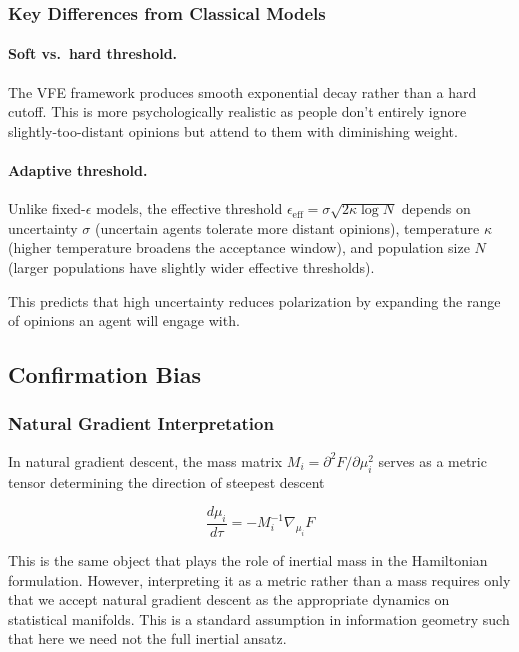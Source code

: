 \documentclass[12pt]{article}
\begin{document}
\subsubsection{Key Differences from Classical Models}

\paragraph{Soft vs.\ hard threshold.} The VFE framework produces smooth exponential 
decay rather than a hard cutoff. This is more psychologically realistic as people 
don't entirely ignore slightly-too-distant opinions but attend to them with 
diminishing weight.

\paragraph{Adaptive threshold.} Unlike fixed-$\epsilon$ models, the effective 
threshold $\epsilon_{\text{eff}} = \sigma\sqrt{2\kappa\log N}$ depends on uncertainty $\sigma$ (uncertain agents tolerate more distant opinions), 
temperature $\kappa$ (higher temperature broadens the acceptance window), and
population size $N$ (larger populations have slightly wider effective thresholds).


This predicts that high uncertainty reduces polarization by expanding the range of opinions an agent will engage with.

\subsection{Confirmation Bias}

\subsubsection{Natural Gradient Interpretation}

In natural gradient descent, the mass matrix $M_i = \partial^2 F/\partial\mu_i^2$ 
serves as a metric tensor determining the direction of steepest descent

\begin{equation}
\frac{d\mu_i}{d\tau} = -M_i^{-1} \nabla_{\mu_i} F
\end{equation}

This is the same object that plays the role of inertial mass in the Hamiltonian 
formulation. However, interpreting it as a metric rather than a mass 
requires only that we accept natural gradient descent as the appropriate dynamics 
on statistical manifolds. This is a standard assumption in information geometry 
\citep{Amari2016} such that here we need not the full inertial ansatz.
\end{document}
